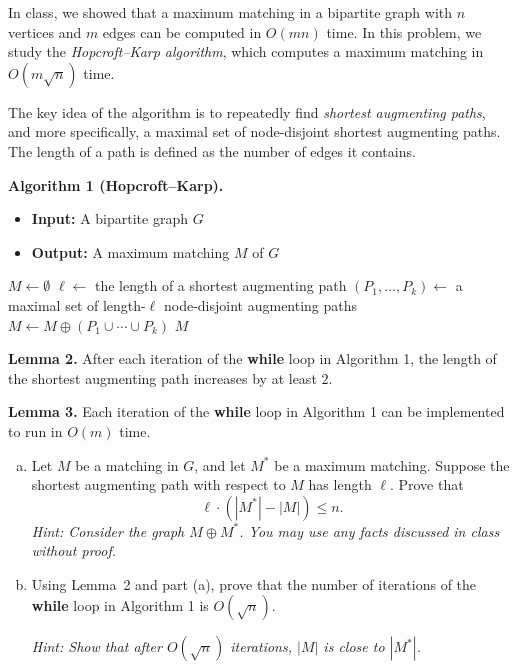 \documentclass{cs0500}
\begin{document}
\begin{problem}
In class, we showed that a maximum matching in a bipartite graph with $n$ vertices
and $m$ edges can be computed in $O(mn)$ time. In this problem, we study the
\emph{Hopcroft--Karp algorithm}, which computes a maximum matching in
$O(m\sqrt{n})$ time.

The key idea of the algorithm is to repeatedly find \emph{shortest augmenting paths},
and more specifically, a maximal set of node-disjoint shortest augmenting paths.
The length of a path is defined as the number of edges it contains.

\medskip

\noindent
\textbf{Algorithm 1 (Hopcroft--Karp).}
\begin{itemize}
    \item \textbf{Input:} A bipartite graph $G$
    \item \textbf{Output:} A maximum matching $M$ of $G$
\end{itemize}

\begin{algorithmic}
\State $M \gets \emptyset$
    \State $\ell \gets$ the length of a shortest augmenting path
    \State $(P_1,\dots,P_k) \gets$ a maximal set of length-$\ell$ node-disjoint augmenting paths
    \State $M \gets M \oplus (P_1 \cup \cdots \cup P_k)$
\EndWhile
\State \Return $M$
\end{algorithmic}

\medskip

\noindent
\textbf{Lemma 2.} After each iteration of the \textbf{while} loop in Algorithm 1,
the length of the shortest augmenting path increases by at least $2$.

\medskip

\noindent
\textbf{Lemma 3.} Each iteration of the \textbf{while} loop in Algorithm 1
can be implemented to run in $O(m)$ time.

\medskip

\begin{enumerate}[(a)]
    \item Let $M$ be a matching in $G$, and let $M^*$ be a maximum matching.
    Suppose the shortest augmenting path with respect to $M$ has length $\ell$.
    Prove that
    \[
        \ell \cdot (|M^*| - |M|) \le n.
    \]
    \emph{Hint: Consider the graph $M \oplus M^*$. You may use any facts discussed
    in class without proof.}

    \item Using Lemma~2 and part (a), prove that the number of iterations of the
    \textbf{while} loop in Algorithm 1 is $O(\sqrt{n})$.

    \emph{Hint: Show that after $O(\sqrt{n})$ iterations, $|M|$ is close to
    $|M^*|$.}
\end{enumerate}
\end{problem}
\begin{solution}
    
\end{solution}
\end{document}
